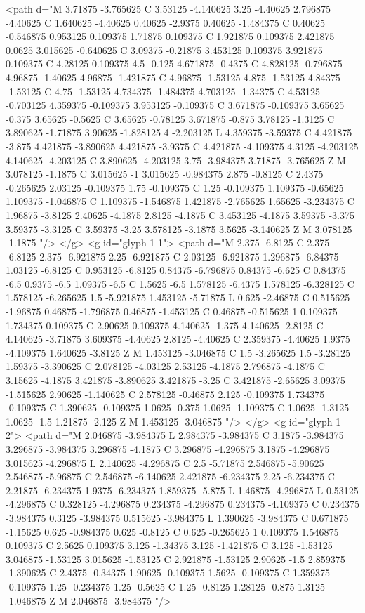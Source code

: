 <path d="M 3.71875 -3.765625 C 3.53125 -4.140625 3.25 -4.40625 2.796875 -4.40625 C 1.640625 -4.40625 0.40625 -2.9375 0.40625 -1.484375 C 0.40625 -0.546875 0.953125 0.109375 1.71875 0.109375 C 1.921875 0.109375 2.421875 0.0625 3.015625 -0.640625 C 3.09375 -0.21875 3.453125 0.109375 3.921875 0.109375 C 4.28125 0.109375 4.5 -0.125 4.671875 -0.4375 C 4.828125 -0.796875 4.96875 -1.40625 4.96875 -1.421875 C 4.96875 -1.53125 4.875 -1.53125 4.84375 -1.53125 C 4.75 -1.53125 4.734375 -1.484375 4.703125 -1.34375 C 4.53125 -0.703125 4.359375 -0.109375 3.953125 -0.109375 C 3.671875 -0.109375 3.65625 -0.375 3.65625 -0.5625 C 3.65625 -0.78125 3.671875 -0.875 3.78125 -1.3125 C 3.890625 -1.71875 3.90625 -1.828125 4 -2.203125 L 4.359375 -3.59375 C 4.421875 -3.875 4.421875 -3.890625 4.421875 -3.9375 C 4.421875 -4.109375 4.3125 -4.203125 4.140625 -4.203125 C 3.890625 -4.203125 3.75 -3.984375 3.71875 -3.765625 Z M 3.078125 -1.1875 C 3.015625 -1 3.015625 -0.984375 2.875 -0.8125 C 2.4375 -0.265625 2.03125 -0.109375 1.75 -0.109375 C 1.25 -0.109375 1.109375 -0.65625 1.109375 -1.046875 C 1.109375 -1.546875 1.421875 -2.765625 1.65625 -3.234375 C 1.96875 -3.8125 2.40625 -4.1875 2.8125 -4.1875 C 3.453125 -4.1875 3.59375 -3.375 3.59375 -3.3125 C 3.59375 -3.25 3.578125 -3.1875 3.5625 -3.140625 Z M 3.078125 -1.1875 "/>
</g>
<g id="glyph-1-1">
<path d="M 2.375 -6.8125 C 2.375 -6.8125 2.375 -6.921875 2.25 -6.921875 C 2.03125 -6.921875 1.296875 -6.84375 1.03125 -6.8125 C 0.953125 -6.8125 0.84375 -6.796875 0.84375 -6.625 C 0.84375 -6.5 0.9375 -6.5 1.09375 -6.5 C 1.5625 -6.5 1.578125 -6.4375 1.578125 -6.328125 C 1.578125 -6.265625 1.5 -5.921875 1.453125 -5.71875 L 0.625 -2.46875 C 0.515625 -1.96875 0.46875 -1.796875 0.46875 -1.453125 C 0.46875 -0.515625 1 0.109375 1.734375 0.109375 C 2.90625 0.109375 4.140625 -1.375 4.140625 -2.8125 C 4.140625 -3.71875 3.609375 -4.40625 2.8125 -4.40625 C 2.359375 -4.40625 1.9375 -4.109375 1.640625 -3.8125 Z M 1.453125 -3.046875 C 1.5 -3.265625 1.5 -3.28125 1.59375 -3.390625 C 2.078125 -4.03125 2.53125 -4.1875 2.796875 -4.1875 C 3.15625 -4.1875 3.421875 -3.890625 3.421875 -3.25 C 3.421875 -2.65625 3.09375 -1.515625 2.90625 -1.140625 C 2.578125 -0.46875 2.125 -0.109375 1.734375 -0.109375 C 1.390625 -0.109375 1.0625 -0.375 1.0625 -1.109375 C 1.0625 -1.3125 1.0625 -1.5 1.21875 -2.125 Z M 1.453125 -3.046875 "/>
</g>
<g id="glyph-1-2">
<path d="M 2.046875 -3.984375 L 2.984375 -3.984375 C 3.1875 -3.984375 3.296875 -3.984375 3.296875 -4.1875 C 3.296875 -4.296875 3.1875 -4.296875 3.015625 -4.296875 L 2.140625 -4.296875 C 2.5 -5.71875 2.546875 -5.90625 2.546875 -5.96875 C 2.546875 -6.140625 2.421875 -6.234375 2.25 -6.234375 C 2.21875 -6.234375 1.9375 -6.234375 1.859375 -5.875 L 1.46875 -4.296875 L 0.53125 -4.296875 C 0.328125 -4.296875 0.234375 -4.296875 0.234375 -4.109375 C 0.234375 -3.984375 0.3125 -3.984375 0.515625 -3.984375 L 1.390625 -3.984375 C 0.671875 -1.15625 0.625 -0.984375 0.625 -0.8125 C 0.625 -0.265625 1 0.109375 1.546875 0.109375 C 2.5625 0.109375 3.125 -1.34375 3.125 -1.421875 C 3.125 -1.53125 3.046875 -1.53125 3.015625 -1.53125 C 2.921875 -1.53125 2.90625 -1.5 2.859375 -1.390625 C 2.4375 -0.34375 1.90625 -0.109375 1.5625 -0.109375 C 1.359375 -0.109375 1.25 -0.234375 1.25 -0.5625 C 1.25 -0.8125 1.28125 -0.875 1.3125 -1.046875 Z M 2.046875 -3.984375 "/>
